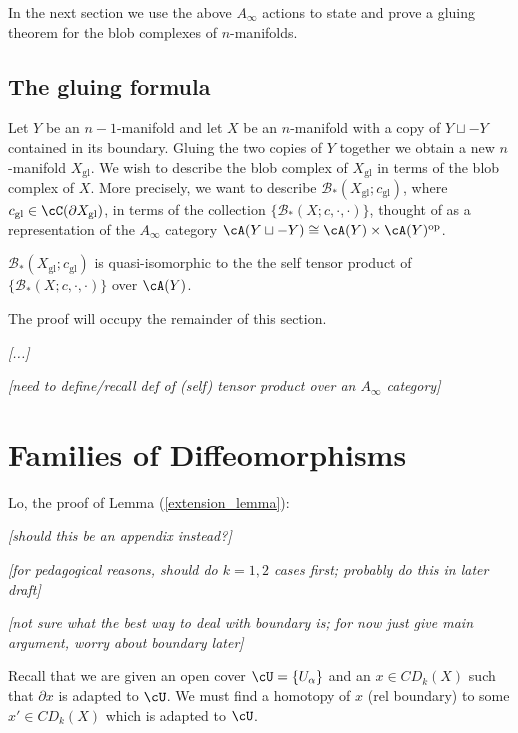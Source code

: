\documentclass[11pt,leqno]{amsart}
\def\bc{{\mathcal B}}
\def\du{\sqcup}
\def\bd{\partial}
\def\sgl{_\mathrm{gl}}
\def\op{^\mathrm{op}}
\def\nn#1{{{\it \small [#1]}}}
\begin{document}
In the next section we use the above $A_\infty$ actions to state and prove
a gluing theorem for the blob complexes of $n$-manifolds.


\subsection{The gluing formula}

Let $Y$ be an $n{-}1$-manifold and let $X$ be an $n$-manifold with a copy
of $Y \du -Y$ contained in its boundary.
Gluing the two copies of $Y$ together we obtain a new $n$-manifold $X\sgl$.
We wish to describe the blob complex of $X\sgl$ in terms of the blob complex
of $X$.
More precisely, we want to describe $\bc_*(X\sgl; c\sgl)$,
where $c\sgl \in \cC(\bd X\sgl)$,
in terms of the collection $\{\bc_*(X; c, \cdot, \cdot)\}$, thought of as a representation
of the $A_\infty$ category $\cA(Y\du-Y) \cong \cA(Y)\times \cA(Y)\op$.

\begin{thm}
$\bc_*(X\sgl; c\sgl)$ is quasi-isomorphic to the the self tensor product
of $\{\bc_*(X; c, \cdot, \cdot)\}$ over $\cA(Y)$.
\end{thm}

The proof will occupy the remainder of this section.

\nn{...}

\bigskip

\nn{need to define/recall def of (self) tensor product over an $A_\infty$ category}




\appendix

\section{Families of Diffeomorphisms}  \label{sec:localising}


Lo, the proof of Lemma (\ref{extension_lemma}):

\nn{should this be an appendix instead?}

\nn{for pedagogical reasons, should do $k=1,2$ cases first; probably do this in
later draft}

\nn{not sure what the best way to deal with boundary is; for now just give main argument, worry
about boundary later}

Recall that we are given
an open cover $\cU = \{U_\alpha\}$ and an
$x \in CD_k(X)$ such that $\bd x$ is adapted to $\cU$.
We must find a homotopy of $x$ (rel boundary) to some $x' \in CD_k(X)$ which is adapted to $\cU$.
\end{document}
